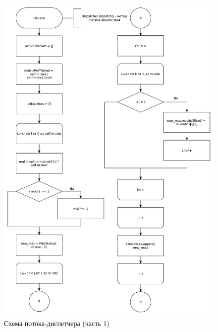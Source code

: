 \documentclass[a4paper,oneside,14pt]{extreport}
\begin{document}
\begin{figure}[H]
	\centering
	\includegraphics[width=0.85\linewidth]{images/solver_part_1}
	\caption{Схема потока-диспетчера (часть 1)}
	\label{img:solver_1}
\end{figure}
\end{document}

